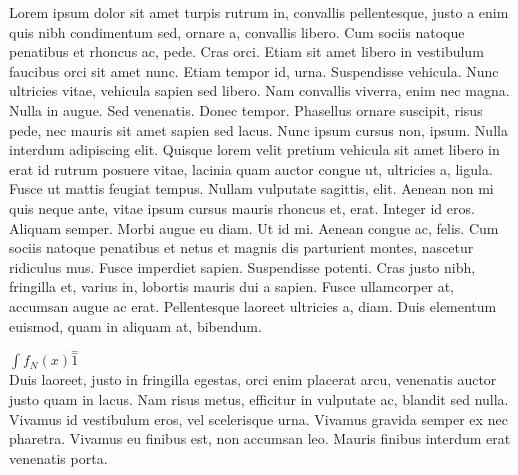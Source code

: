 \documentclass{article}
\begin{document}
Lorem ipsum dolor sit amet turpis rutrum in, convallis pellentesque, justo a enim quis nibh condimentum sed, ornare a, convallis libero. Cum sociis natoque penatibus et rhoncus ac, pede. Cras orci. Etiam sit amet libero in vestibulum faucibus orci sit amet nunc. Etiam tempor id, urna. Suspendisse vehicula. Nunc ultricies vitae, vehicula sapien sed libero. Nam convallis viverra, enim nec magna. Nulla in augue. Sed venenatis. Donec tempor. Phasellus ornare suscipit, risus pede, nec mauris sit amet sapien sed lacus. Nunc ipsum cursus non, ipsum. Nulla interdum adipiscing elit. Quisque lorem velit pretium vehicula sit amet libero in erat id rutrum posuere vitae, lacinia quam auctor congue ut, ultricies a, ligula. Fusce ut mattis feugiat tempus. Nullam vulputate sagittis, elit. Aenean non mi quis neque ante, vitae ipsum cursus mauris rhoncus et, erat. Integer id eros. Aliquam semper. Morbi augue eu diam. Ut id mi. Aenean congue ac, felis. Cum sociis natoque penatibus et netus et magnis dis parturient montes, nascetur ridiculus mus. Fusce imperdiet sapien. Suspendisse potenti. Cras justo nibh, fringilla et, varius in, lobortis mauris dui a sapien. Fusce ullamcorper at, accumsan augue ac erat. Pellentesque laoreet ultricies a, diam. Duis elementum euismod, quam in aliquam at, bibendum.

\begin{math}
	\int {f_N(x) \stackrel{=} 1}
\end{math}\\
Duis laoreet, justo in fringilla egestas, orci enim placerat arcu, venenatis auctor justo quam in lacus. Nam risus metus, efficitur in vulputate ac, blandit sed nulla. Vivamus id vestibulum eros, vel scelerisque urna. Vivamus gravida semper ex nec pharetra. Vivamus eu finibus est, non accumsan leo. Mauris finibus interdum erat venenatis porta. 
\end{document}
